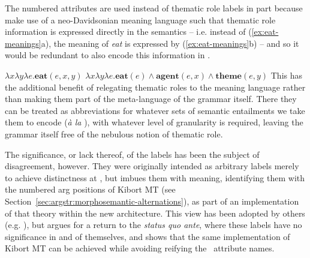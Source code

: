 \documentclass[output=paper]{langscibook}
\begin{document}
The numbered \ARG attributes are used instead of 
thematic role labels in part because \citet{AsudGior12} make use of a
neo-David\-so\-nian meaning language \citep{parsons1990events} such that thematic
role information is expressed directly in the semantics -- i.e. instead of
(\ref{ex:eat-meanings}a), the meaning of \textit{eat} is expressed by
(\ref{ex:eat-meanings}b) -- and so it would be redundant to also encode this
information in \sstruc{}.

\ea\label{ex:eat-meanings}
\ea
$\lambda x \lambda y \lambda e. \mathbf{eat}(e,x,y)$
\ex
$\lambda x \lambda y \lambda e. \mathbf{eat}(e) \land \mathbf{agent}(e,x) \land \mathbf{theme}(e,y)$
\z
\z
%
This has the additional benefit of relegating thematic roles to the meaning
language rather than making them part of the meta-language of the grammar
itself. There they can be treated as abbreviations for whatever sets of semantic
entailments we take them to encode (\textit{\`a la} \citealt{Dowty1991}), with
whatever level of granularity is required, leaving the grammar itself free of
the nebulous notion of thematic role.

\largerpage
The significance, or lack thereof, of the \ARG labels has been the subject of
disagreement, however. They were originally intended as arbitrary labels merely
to achieve distinctness at \sstruc{}, but \citet{findlay2017mapping} imbues them
with meaning, identifying them with the numbered arg positions of Kibort MT (see
Section~\ref{sec:argstr:morphosemantic-alternations}), as part of an implementation of
that theory within the new architecture. This view has been adopted by others
(e.g. \citealt{asudeh2014meaning,Lowe2015,Lovestrand2018,Lovestrand2020}), but
\citet{Findlay2020} argues for a return to the \textit{status quo ante}, where
these labels have no significance in and of themselves, and shows that the same
implementation of Kibort MT can be achieved while avoiding reifying the \sstruc\
attribute names.
\end{document}
